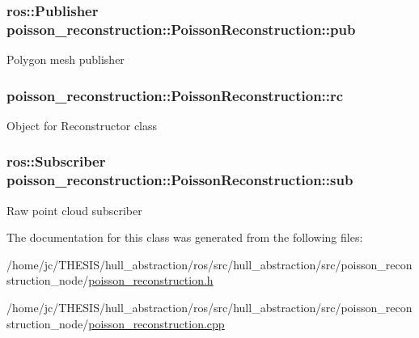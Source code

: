 \subsubsection[{\texorpdfstring{pub}{pub}}]{\setlength{\rightskip}{0pt plus 5cm}ros\+::\+Publisher poisson\+\_\+reconstruction\+::\+Poisson\+Reconstruction\+::pub\hspace{0.3cm}{\ttfamily [private]}}\hypertarget{classpoisson__reconstruction_1_1_poisson_reconstruction_ad327638b4ca620ad0eebc8c9ba2f0dc5}{}\label{classpoisson__reconstruction_1_1_poisson_reconstruction_ad327638b4ca620ad0eebc8c9ba2f0dc5}
Polygon mesh publisher 
\subsubsection[{\texorpdfstring{rc}{rc}}]{ poisson\+\_\+reconstruction\+::\+Poisson\+Reconstruction\+::rc\hspace{0.3cm}{\ttfamily [private]}}\hypertarget{classpoisson__reconstruction_1_1_poisson_reconstruction_a2afb3b38fc52d7d8a0ef3e9a4d65027b}{}\label{classpoisson__reconstruction_1_1_poisson_reconstruction_a2afb3b38fc52d7d8a0ef3e9a4d65027b}
Object for Reconstructor class 
\subsubsection[{\texorpdfstring{sub}{sub}}]{\setlength{\rightskip}{0pt plus 5cm}ros\+::\+Subscriber poisson\+\_\+reconstruction\+::\+Poisson\+Reconstruction\+::sub\hspace{0.3cm}{\ttfamily [private]}}\hypertarget{classpoisson__reconstruction_1_1_poisson_reconstruction_a35abf57328b8f673fa0d0631378d8f19}{}\label{classpoisson__reconstruction_1_1_poisson_reconstruction_a35abf57328b8f673fa0d0631378d8f19}
Raw point cloud subscriber 

The documentation for this class was generated from the following files\+:\begin{DoxyCompactItemize}
\item 
/home/jc/\+T\+H\+E\+S\+I\+S/hull\+\_\+abstraction/ros/src/hull\+\_\+abstraction/src/poisson\+\_\+reconstruction\+\_\+node/\hyperlink{poisson__reconstruction_8h}{poisson\+\_\+reconstruction.\+h}\item 
/home/jc/\+T\+H\+E\+S\+I\+S/hull\+\_\+abstraction/ros/src/hull\+\_\+abstraction/src/poisson\+\_\+reconstruction\+\_\+node/\hyperlink{poisson__reconstruction_8cpp}{poisson\+\_\+reconstruction.\+cpp}\end{DoxyCompactItemize}
